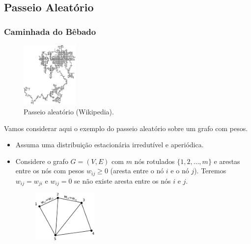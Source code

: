 \subsection{Passeio Aleatório}
\begin{frame}[allowframebreaks]
  \frametitle{Caminhada do Bêbado}
        \begin{figure}[h!]
        \centering
        \includegraphics[width=0.25\textwidth]{images/randomwalk.pdf}
        \caption{Passeio aleatório (Wikipedia).}
        \label{fig:random_walk_2d}
        \end{figure}

  Vamos considerar aqui o exemplo do passeio aleatório sobre um grafo com pesos.
  \begin{itemize}
  \item Assuma uma distribuição estacionária irredutível e aperiódica.
  \item Considere o grafo $G=(V,E)$ com $m$ nós rotulados $\{1, 2, \ldots, m\}$ e arestas entre os nós com pesos $w_{ij} \geq 0$ 
	(aresta entre o nó $i$ e o nó $j$). Teremos $w_{ij} = w_{ji}$ e $w_{ij}=0$ se não existe aresta entre os nós $i$ e $j$.

        \begin{figure}[h!]
        \centering
        \includegraphics[width=0.3\textwidth]{images/grafo.pdf}
        \label{fig:grafo}
        \end{figure}


\end{itemize}
\end{frame}
